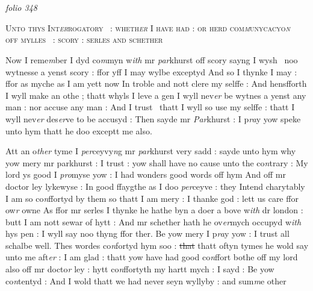 \documentclass[12pt, a4paper]{book}
\begin{document}
\dotfill
						\newpage {} \section*{}  \subsection*{}

\textit{folio 348}




				\begin{center} \begin{large} {\scshape Unto thys Int\textit{er}rogatory  : wheth\textit{er }
I have had : or herd com\textit{m}unycacyo\textit{n} 
off mylles  : scory : serles and schether} \end{large} \end{center}
			


		\ifthenelse{\isodd{\thepage}}
		{\reversemarginpar}
		{\normalmarginpar}
		Now I reme\textit{m}ber I dyd co\textit{m}myn w\textit{ith} mr \textit{par}khurst off scory sayng I wysh 
noo wytnesse a yenst scory : ffor yff I may wylbe exceptyd
And so I thynke I may : ffor as myche as I am yett now In
troble and nott clere my selffe : And hensfforth I wyll make 
an othe ; thatt whyls I leve a gen I wyll nev\textit{er} be wytnes 
a yenst any man : nor accuse any man : And I trust 
thatt I wyll so use my selffe : thatt I wyll nev\textit{er} des\textit{er}ve
to be accusyd : Then sayde mr \textit{Par}khurst : I p\textit{ra}y yow speke 
unto hym thatt he doo exceptt me also. 


		\ifthenelse{\isodd{\thepage}}
		{\reversemarginpar}
		{\normalmarginpar}
		Att an o\textit{ther} tyme I \textit{per}ceyvy\textit{n}g mr \textit{par}khurst very sadd : sayde unto hym why
yow mery mr parkhurst : I trust : yow shall have no cause unto the
co\textit{n}trary : My lord ys good I \textit{pro}myse yow : I had wonders good words 
off hym And off mr doctor ley lykewyse : In good ffaygthe as I doo 
\textit{per}ceyve : they Intend charytably I am so co\textit{n}ffortyd by them so 
thatt I am mery : I thanke god : lett us care ffor ow\textit{r} owne
As ffor mr serles I thynke he hathe byn a doer a bove w\textit{ith} dr 
london : butt I am nott sewar of hytt : And mr schether hath he 
ov\textit{er}mych occupyd w\textit{ith} hys pen : I wyll say noo thyng ffor ther.
Be yow mery I p\textit{ra}y yow : I trust all schalbe well. Thes
wordes co\textit{n}fortyd hym soo : \sout{that} thatt oftyn tymes he wold say
unto me aft\textit{er} : I am glad : thatt yow have had good co\textit{n}ffort
bothe off my lord also off mr docto\textit{r} ley : hytt co\textit{n}ffortyth my hartt
mych : I sayd : Be yow co\textit{n}tentyd : And I wold thatt we had never 
seyn wyllyby : and sum\textit{m}e other
\end{document}
